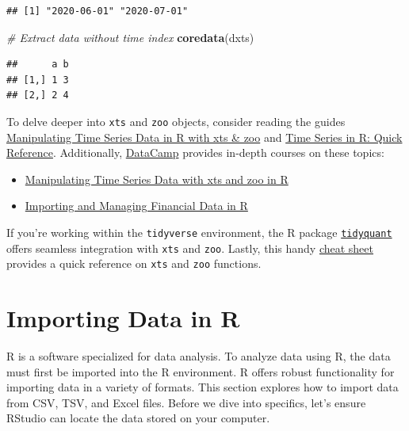 \documentclass[
]{book}
\newenvironment{Shaded}{\begin{snugshade}}{\end{snugshade}}
\newcommand{\CommentTok}[1]{\textcolor[rgb]{0.56,0.35,0.01}{\textit{#1}}}
\newcommand{\FunctionTok}[1]{\textcolor[rgb]{0.13,0.29,0.53}{\textbf{#1}}}
\newcommand{\NormalTok}[1]{#1}
\providecommand{\tightlist}{%
  \setlength{\itemsep}{0pt}\setlength{\parskip}{0pt}}
\begin{document}
\begin{verbatim}
## [1] "2020-06-01" "2020-07-01"
\end{verbatim}

\begin{Shaded}
\begin{Highlighting}[]
\CommentTok{\# Extract data without time index}
\FunctionTok{coredata}\NormalTok{(dxts)}
\end{Highlighting}
\end{Shaded}

\begin{verbatim}
##      a b
## [1,] 1 3
## [2,] 2 4
\end{verbatim}

To delve deeper into \texttt{xts} and \texttt{zoo} objects, consider reading the guides \href{https://rstudio-pubs-static.s3.amazonaws.com/288218_117e183e74964557a5da4fc5902fc671.html}{Manipulating Time Series Data in R with xts \& zoo} and \href{https://rpubs.com/rmariscal/404513}{Time Series in R: Quick Reference}. Additionally, \href{https://learn.datacamp.com/}{DataCamp} provides in-depth courses on these topics:

\begin{itemize}
\tightlist
\item
  \href{https://learn.datacamp.com/courses/manipulating-time-series-data-with-xts-and-zoo-in-r}{Manipulating Time Series Data with xts and zoo in R}
\item
  \href{https://learn.datacamp.com/courses/importing-and-managing-financial-data-in-r}{Importing and Managing Financial Data in R}
\end{itemize}

If you're working within the \texttt{tidyverse} environment, the R package \href{http://www.stats.bris.ac.uk/R/web/packages/tidyquant/vignettes/TQ02-quant-integrations-in-tidyquant.html}{\texttt{tidyquant}} offers seamless integration with \texttt{xts} and \texttt{zoo}. Lastly, this handy \href{https://s3.amazonaws.com/assets.datacamp.com/blog_assets/xts_Cheat_Sheet_R.pdf}{cheat sheet} provides a quick reference on \texttt{xts} and \texttt{zoo} functions.

\hypertarget{importing-data-in-r}{%
\section{Importing Data in R}\label{importing-data-in-r}}

R is a software specialized for data analysis. To analyze data using R, the data must first be imported into the R environment. R offers robust functionality for importing data in a variety of formats. This section explores how to import data from CSV, TSV, and Excel files. Before we dive into specifics, let's ensure RStudio can locate the data stored on your computer.
\end{document}
